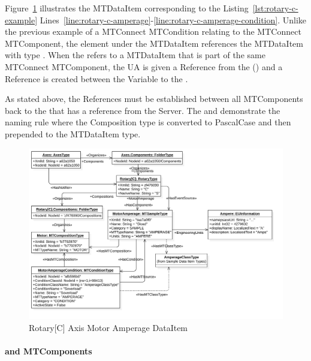 \FloatBarrier

Figure~\ref{fig:rotary-c-amperage} illustrates the  \gls{MTDataItem} corresponding to the Listing~\ref{lst:rotary-c-example} Lines~\ref{line:rotary-c-amperage}-\ref{line:rotary-c-amperage-condition}. Unlike the previous example of a MTConnect \gls{MTCondition} relating to the MTConnect \gls{MTComponent}, the  element under the \gls{MTDataItem} references the \gls{MTDataItem} with \gls{type} . When the  refers to a \gls{MTDataItem} that is part of the same MTConnect \gls{MTComponent}, the UA  is given a \gls{Reference}  from the  () and a  \gls{Reference} is created between the \gls{Variable} to the .

As stated above, the  \glspl{Reference} must be established between all \glspl{MTComponent} back to the  that has a reference from the \gls{Server}. The  and  demonstrate the naming rule where the \gls{Composition} \gls{type} is converted to \gls{PascalCase} and then prepended to the \gls{MTDataItem} \gls{type}. 

\begin{figure}[ht]
  \centering
  \includegraphics[width=1.0\textwidth]{diagrams/mtconnect-mapping/rotary-c-amperage.png}
  \caption{Rotary[C] Axis Motor Amperage DataItem}
  \label{fig:rotary-c-amperage}
\end{figure}

\FloatBarrier

\paragraph{ and  \gls{MTComponent}s}

